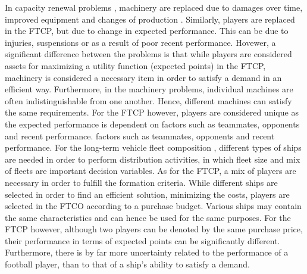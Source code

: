 \newpar
In capacity renewal problems \citep{Chand,Rajagopalan}, machinery are replaced due to damages over time, improved equipment and changes of production \citep{Hopp,Adkins}. Similarly, players are replaced in the FTCP, but due to change in expected performance. This can be due to injuries, suspensions or as a result of poor recent performance. Hovewer, a significant difference between the problems is that while players are considered assets for maximizing a utility function (expected points) in the FTCP, machinery is considered a necessary item in order to satisfy a demand in an efficient way. Furthermore, in the machinery problems, individual machines are often indistinguishable from one another. Hence, different machines can satisfy the same requirements. For the FTCP however, players are considered unique as the expected performance is dependent on factors such as teammates, opponents and recent performance. factors such as teammates, opponents and recent performance. 
\newpar
For the long-term vehicle fleet composition \citep{Jabali}, different types of ships are needed in order to perform distribution activities, in which fleet size and mix of fleets are important decision variables. As for the FTCP, a mix of players are necessary in order to fulfill the formation criteria. While different ships are selected in order to find an efficient solution, minimizing the costs, players are selected in the FTCO according to a purchase budget. Various ships may contain the same characteristics and can hence be used for the same purposes. For the FTCP however, although two players can be denoted by the same purchase price, their performance in terms of expected points can be significantly different. Furthermore, there is by far more uncertainty related to the performance of a football player, than to that of a ship's ability to satisfy a demand. 







\begin{comment}
\cite{Bell} studied team composition variables in order to increase team performance. The results of the meta-analysis performed can be used to effectively compose teams in organizations. \cite{Davis} aim to determine the optimal composition of the pre-hospital medical response team and evaluate the importance of including a doctor to the team. \cite{Jabali} present a continuous approximation model to determine the long-term vehicle fleet composition needed to perform distribution activities, in which fleet size and mix of fleets are important decision variables.  These problems resembles the Fantasy Team problem as similar decisions arise when one are to decide which formation one should use in addition to the mix of players. 
\end{comment}




